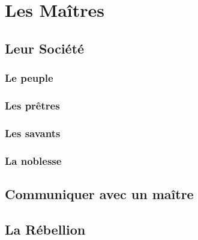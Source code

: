 \chapter{Les Maîtres}

\section{Leur Société}

\subsection{Le peuple}

\subsection{Les prêtres}

\subsection{Les savants}

\subsection{La noblesse}

\section{Communiquer avec un maître}

\section{La Rébellion}